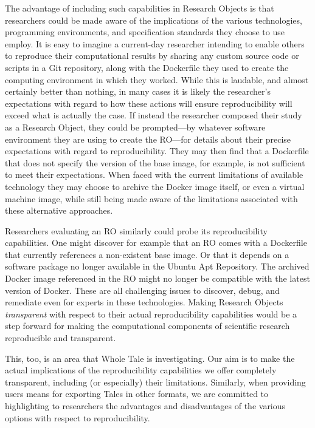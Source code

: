 The advantage of including such capabilities in Research Objects is that researchers could be made aware
	of the implications of the various technologies, programming environments, and specification
	standards they choose to use employ.
It is easy to imagine a current-day researcher intending to enable others to reproduce their computational
	results by sharing any custom source code or scripts in a Git repository, along with the Dockerfile
	they used to create the computing environment in which they worked.
While this is laudable, and almost certainly better than nothing, in many cases it is likely the researcher's
	expectations with regard to how these actions will ensure reproducibility will exceed
	what is actually the case.
If instead the researcher composed their study as a Research Object, they could be prompted---by whatever
	software environment they are using to create the RO---for details about their precise expectations with 
	regard to reproducibility.
They may then find that a Dockerfile that does not specify the version of the base image, for example, is not sufficient
	to meet their expectations.
When faced with the current limitations of available technology they may choose to archive the Docker image itself, 
	or even a virtual machine image, while still being made aware of the limitations associated with these alternative
	approaches.

Researchers evaluating an RO similarly could probe its reproducibility capabilities.  One might discover for example
	that an RO comes with a Dockerfile that currently references a non-existent base image.  
Or that it depends on a software package no longer available in the Ubuntu Apt Repository.  
The archived Docker image referenced in the RO might no longer be compatible with the latest version of Docker.  
These are all challenging issues to discover, debug, and remediate even for experts in these technologies.
Making Research Objects \emph{transparent} with respect to their actual reproducibility capabilities would be a
	step forward for making the computational components of scientific research reproducible and
	transparent.

This, too, is an area that Whole Tale is investigating.  Our aim is to make the actual implications of the
	reproducibility capabilities we offer completely transparent, including (or especially) their limitations.
Similarly, when providing users means for exporting Tales in other formats, we are committed to highlighting
	to researchers the advantages and disadvantages of the various options with respect to reproducibility.
	

